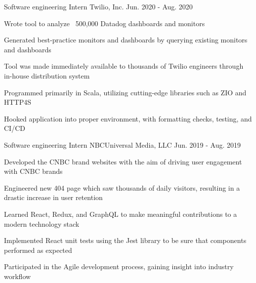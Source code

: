 

\begin{cventries}


  \cventry
    {Software engineering Intern} %
    {Twilio, Inc.} %
    {} %
    {Jun. 2020 - Aug. 2020} %
    {
      \begin{cvitems} %
        \item {Wrote tool to analyze ~500,000 Datadog dashboards and monitors}
        \item {Generated best-practice monitors and dashboards by querying existing monitors and dashboards}
        \item {Tool was made immediately available to thousands of Twilio engineers through in-house distribution system}
        \item {Programmed primarily in Scala, utilizing cutting-edge libraries such as ZIO and HTTP4S}
        \item {Hooked application into proper environment, with formatting checks, testing, and CI/CD}
        \end{cvitems}
    }

  \cventry
    {Software engineering Intern} %
    {NBCUniversal Media, LLC} %
    {} %
    {Jun. 2019 - Aug. 2019} %
    {
      \begin{cvitems} %
        \item {Developed the CNBC brand websites with the aim of driving user engagement with CNBC brands}
        \item {Engineered new 404 page which saw thousands of daily visitors, resulting in a drastic increase in user retention}
        \item {Learned React, Redux, and GraphQL to make meaningful contributions to a modern technology stack}
        \item {Implemented React unit tests using the Jest library to be sure that components performed as expected}
        \item {Participated in the Agile development process, gaining insight into industry workflow}
        \end{cvitems}
    }


\end{cventries}
